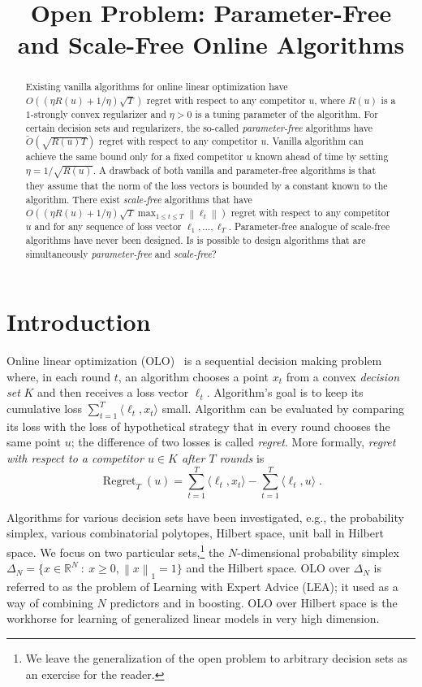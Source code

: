 \documentclass{colt2016} %
\title{Open Problem: Parameter-Free and Scale-Free Online Algorithms}
\DeclareMathOperator{\Regret}{Regret}
\newcommand{\R}{\mathbb{R}}     %
\newcommand{\norm}[1]{\left\|{#1}\right\|}
\begin{document}
\maketitle

\begin{abstract}
Existing vanilla algorithms for online linear optimization have $O((\eta R(u) +
1/\eta) \sqrt{T})$ regret with respect to any competitor $u$, where $R(u)$ is a
$1$-strongly convex regularizer and $\eta > 0$ is a tuning parameter of the
algorithm. For certain decision sets and regularizers, the so-called
\emph{parameter-free} algorithms have $\widetilde O(\sqrt{R(u) T})$ regret with
respect to any competitor $u$.  Vanilla algorithm can achieve the same bound
only for a fixed competitor $u$ known ahead of time by setting $\eta =
1/\sqrt{R(u)}$. A drawback of both vanilla and parameter-free algorithms is
that they assume that the norm of the loss vectors is bounded by a constant
known to the algorithm. There exist \emph{scale-free} algorithms that have
$O((\eta R(u) + 1/\eta) \sqrt{T} \max_{1 \le t \le T} \norm{\ell_t})$ regret
with respect to any competitor $u$ and for any sequence of loss vector $\ell_1,
\dots, \ell_T$. Parameter-free analogue of scale-free algorithms have never
been designed. Is is possible to design algorithms that are simultaneously
\emph{parameter-free} and \emph{scale-free}?
\end{abstract}

\section{Introduction}

Online linear optimization (OLO)~\citep{Cesa-Bianchi-Lugosi-2006,
Shalev-Shwartz-2011} is a sequential decision making problem where, in each
round $t$, an algorithm chooses a point $x_t$ from a convex \emph{decision set}
$K$ and then receives a loss vector $\ell_t$. Algorithm's goal is to keep its
cumulative loss $\sum_{t=1}^T \langle \ell_t, x_t \rangle$ small. Algorithm can
be evaluated by comparing its loss with the loss of hypothetical strategy that
in every round chooses the same point $u$; the difference of two losses is
called \emph{regret}. More formally, \emph{regret with respect to a competitor
$u \in K$ after $T$ rounds} is
$$
\Regret_T(u) = \sum_{t=1}^T \langle \ell_t, x_t \rangle - \sum_{t=1}^T \langle \ell_t, u \rangle \; .
$$

Algorithms for various decision sets have been investigated, e.g., the
probability simplex, various combinatorial polytopes, Hilbert space, unit ball
in Hilbert space. We focus on two particular sets,\footnote{We leave the
generalization of the open problem to arbitrary decision sets as an exercise
for the reader.} the $N$-dimensional probability simplex $\Delta_N = \{ x \in
\R^N ~:~ x \ge 0, \norm{x}_1 = 1\}$ and the Hilbert space. OLO over $\Delta_N$
is referred to as the problem of Learning with Expert Advice (LEA); it used as
a way of combining $N$ predictors and in boosting. OLO over Hilbert space is
the workhorse for learning of generalized linear models in very high dimension.
\end{document}
